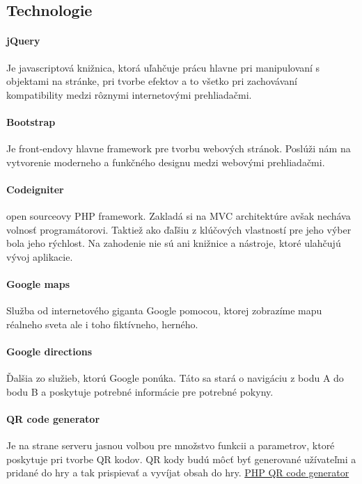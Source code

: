 \subsection{Technologie}


\paragraph{jQuery} Je javascriptová knižnica, ktorá uľahčuje prácu hlavne pri manipulovaní s objektami na stránke, pri tvorbe efektov a to všetko pri zachovávaní kompatibility medzi rôznymi internetovými prehliadačmi.

\paragraph{Bootstrap} Je front-endovy hlavne framework pre tvorbu webových stránok. Poslúži nám na vytvorenie moderneho a funkčného designu  medzi webovými prehliadačmi. 

\paragraph{Codeigniter} open sourceovy PHP framework. Zakladá si na MVC architektúre avšak necháva volnosť programátorovi. Taktiež ako ďaľšiu z klúčových vlastností pre jeho výber bola jeho rýchlost. Na zahodenie nie sú ani knižnice a nástroje, ktoré ulahčujú vývoj aplikacie.

\paragraph{Google maps} Služba od internetového giganta Google pomocou, ktorej zobrazíme mapu réalneho sveta ale i toho fiktívneho, herného. 

\paragraph{Google directions} Ďalšia zo služieb, ktorú Google ponúka. Táto sa stará o navigáciu z bodu A do bodu B a poskytuje potrebné informácie pre potrebné pokyny.

\paragraph{QR code generator} Je na strane serveru jasnou volbou pre množstvo funkcii a parametrov, ktoré poskytuje pri tvorbe QR kodov. QR kody budú môcť byť generované užívateľmi a pridané do hry a tak prispievať a vyvíjat obsah do hry.
\href{http://phpqrcode.sourceforge.net/examples/index.php?example=006}{PHP QR code generator} 

